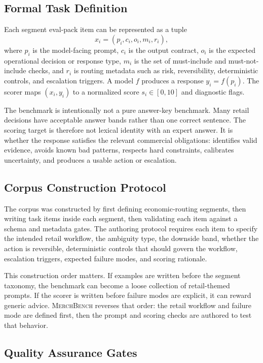 \documentclass[11pt]{article}
\newcommand{\benchmark}{\textsc{MerchBench}}
\begin{document}
\subsection{Formal Task Definition}

Each segment eval-pack item can be represented as a tuple
\[
  x_i = (p_i, c_i, o_i, m_i, r_i),
\]
where \(p_i\) is the model-facing prompt, \(c_i\) is the output contract, \(o_i\) is the expected operational decision or response type, \(m_i\) is the set of must-include and must-not-include checks, and \(r_i\) is routing metadata such as risk, reversibility, deterministic controls, and escalation triggers. A model \(f\) produces a response \(y_i=f(p_i)\). The scorer maps \((x_i,y_i)\) to a normalized score \(s_i \in [0,10]\) and diagnostic flags.

The benchmark is intentionally not a pure answer-key benchmark. Many retail decisions have acceptable answer bands rather than one correct sentence. The scoring target is therefore not lexical identity with an expert answer. It is whether the response satisfies the relevant commercial obligations: identifies valid evidence, avoids known bad patterns, respects hard constraints, calibrates uncertainty, and produces a usable action or escalation.

\subsection{Corpus Construction Protocol}

The corpus was constructed by first defining economic-routing segments, then writing task items inside each segment, then validating each item against a schema and metadata gates. The authoring protocol requires each item to specify the intended retail workflow, the ambiguity type, the downside band, whether the action is reversible, deterministic controls that should govern the workflow, escalation triggers, expected failure modes, and scoring rationale.

This construction order matters. If examples are written before the segment taxonomy, the benchmark can become a loose collection of retail-themed prompts. If the scorer is written before failure modes are explicit, it can reward generic advice. \benchmark{} reverses that order: the retail workflow and failure mode are defined first, then the prompt and scoring checks are authored to test that behavior.

\subsection{Quality Assurance Gates}
\end{document}
